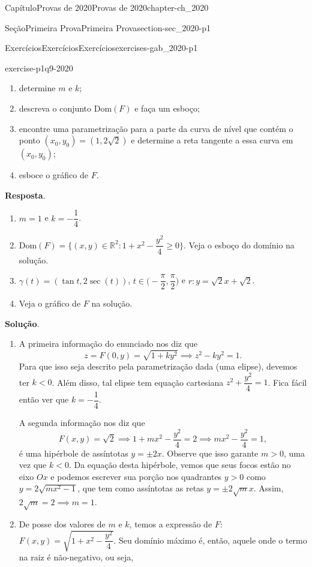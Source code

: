 \documentclass[oneside,10pt,]{book}
\newcommand{\blocktitlefont}{\relax}
\numberwithin{equation}{section}
\begin{document}
\begin{chapterptx}{Capítulo}{Provas de 2020}{}{Provas de 2020}{}{}{chapter-ch_2020}
\begin{sectionptx}{Seção}{Primeira Prova}{}{Primeira Prova}{}{}{section-sec_2020-p1}
\begin{exercises-subsection-numberless}{Exercícios}{Exercícios}{}{Exercícios}{}{}{exercises-gab_2020-p1}
\begin{divisionexercise}{9}{}{}{exercise-p1q9-2020}
\begin{enumerate}[label=\alph*]
\item{}determine \(m\) e \(k\);%
\item{}descreva o conjunto \(\text {Dom}(F)\) e faça um esboço;%
\item{}encontre uma parametrização para a parte da curva de nível que contém o ponto \((x_0,y_0) = (1,2\sqrt {2})\) e determine a reta tangente a essa curva em \((x_0,y_0)\);%
\item{}esboce o gráfico de \(F\).%
\end{enumerate}
%
\par\smallskip%
\noindent\textbf{\blocktitlefont Resposta}.\hypertarget{answer-p1q9-2020-b}{}\quad{}%
\begin{enumerate}[label=\alph*]
\item{}\(m=1\) e \(k=-\dfrac{1}{4}\).%
\item{}\(\text {Dom}(F)=\big\{(x,y)\in\mathbb R^2\colon
1+x^2-\dfrac{y^2}{4}\geq 0 \big\}\). Veja o esboço do domínio na solução.%
\item{}\(\gamma(t)=(\tan t, 2\sec(t))\), \(t\in
\big(-\dfrac{\pi}{2},\dfrac{\pi}{2}\big)\) e \(r\colon
y=\sqrt{2}x+\sqrt{2}\).%
\item{}Veja o gráfico de \(F\) na solução.%
\end{enumerate}
\par\smallskip%
\noindent\textbf{\blocktitlefont Solução}.\hypertarget{solution-p1q9-2020-c}{}\quad{}%
\begin{enumerate}[label=\alph*]
\item{}A primeira informação do enunciado nos diz que%
\begin{equation*}
z=F(0,y)=\sqrt{1+ky^2}\implies z^2-ky^2=1.
\end{equation*}
Para que isso seja descrito pela parametrização dada (uma elipse), devemos ter \(k< 0\). Além disso, tal elipse tem equação cartesiana \(z^2+\dfrac{y^2}{4}=1\). Fica fácil então ver que \(k=-\dfrac{1}{4}\).%
\par
A segunda informação nos diz que%
\begin{equation*}
F(x,y)=\sqrt{2}\implies 1+mx^2-\dfrac{y^2}{4}=2\implies
mx^2-\dfrac{y^2}{4}=1,
\end{equation*}
é uma hipérbole de assíntotas \(y=\pm 2x\).  Observe que isso garante \(m>0\), uma vez que \(k<0\). Da equação desta hipérbole, vemos que seus focos estão no eixo \(Ox\) e podemos escrever sua porção nos quadrantes \(y> 0\) como \(y=2\sqrt{mx^2-1}\), que tem como assíntotas as retas \(y=\pm 2\sqrt{m}x\). Assim, \(2\sqrt{m}=2\implies
m=1\).%
\item{}De posse dos valores de \(m\) e \(k\), temos a expressão de \(F\): \(F(x,y)=\sqrt{1+x^2-\dfrac{y^2}{4}}\). Seu domínio máximo é, então, aquele onde o termo na raiz é não-negativo, ou seja,%

\end{enumerate}
\end{divisionexercise}
\end{exercises-subsection-numberless}
\end{sectionptx}
\end{chapterptx}
\end{document}
